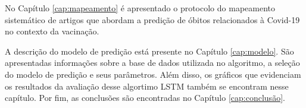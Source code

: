 No Capítulo \ref{cap:mapeamento} é apresentado o protocolo do mapeamento sistemático de artigos que abordam a predição de óbitos relacionados à Covid-19 no contexto da vacinação.

A descrição do modelo de predição está presente no Capítulo \ref{cap:modelo}. São apresentadas informações sobre a base de dados utilizada no algoritmo, a seleção do modelo de predição e seus parâmetros. Além disso, os gráficos que evidenciam os resultados da avaliação desse algortimo LSTM também se encontram nesse capítulo. Por fim, as conclusões são encontradas no Capítulo \ref{cap:conclusão}.

